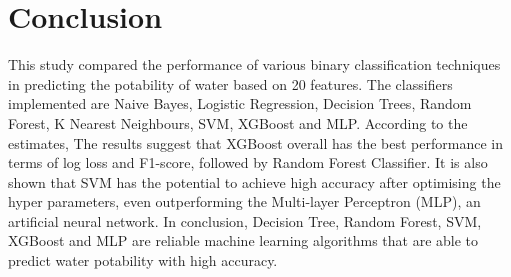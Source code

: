 \documentclass[conference]{IEEEtran}
\begin{document}
\section{Conclusion}
This study compared the performance of various binary classification techniques in predicting the potability of water based on 20 features. The classifiers implemented are Naive Bayes, Logistic Regression, Decision Trees, Random Forest, K Nearest Neighbours, SVM, XGBoost and MLP. According to the estimates, The results suggest that XGBoost overall has the best performance in terms of log loss and F1-score, followed by Random Forest Classifier. It is also shown that SVM has the potential to achieve high accuracy after optimising the hyper parameters, even outperforming the Multi-layer Perceptron (MLP), an artificial neural network. In conclusion, Decision Tree, Random Forest, SVM, XGBoost and MLP are reliable machine learning algorithms that are able to predict water potability with high accuracy. 

\vspace{20pt}

\medskip

\printbibliography
\end{document}
